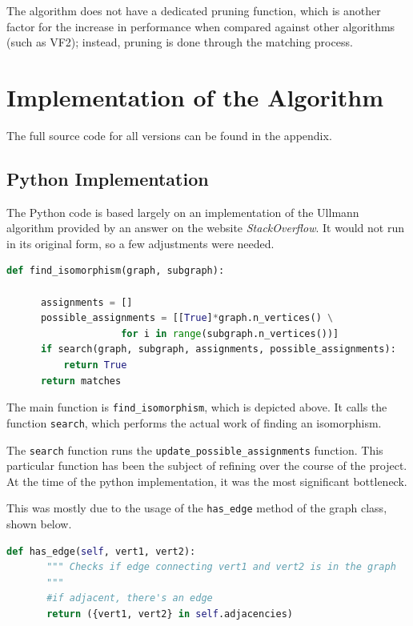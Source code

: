\documentclass{article}
\begin{document}
  The algorithm does not have a dedicated pruning function, which is another factor for the increase in performance when compared against other algorithms (such as VF2); instead, pruning is done through the matching process.\cite{bonnici}

\section{Implementation of the Algorithm}

The full source code for all versions can be found in the appendix.

  \subsection{Python Implementation}
  The Python code is based largely on an implementation of the Ullmann algorithm provided by an answer on the website \textit{StackOverflow}.\cite{pyiso} It would not run in its original form, so a few adjustments were needed.

  \begin{lstlisting}[language=Python,caption={Function used to determine whether an isomorphism exists.}]
  def find_isomorphism(graph, subgraph):

      assignments = []
      possible_assignments = [[True]*graph.n_vertices() \
                    for i in range(subgraph.n_vertices())]
      if search(graph, subgraph, assignments, possible_assignments):
          return True
      return matches
  \end{lstlisting}

  The main function is \texttt{find\_isomorphism}, which is depicted above. It calls the function \texttt{search}, which performs the actual work of finding an isomorphism.

  The \texttt{search} function runs  the \texttt{update\_possible\_assignments} function. This particular function has been the subject of refining over the course of the project. At the time of the python implementation, it was the most significant bottleneck.

  This was mostly due to the usage of the \texttt{has\_edge} method of the graph class, shown below.

  \begin{lstlisting}[language=Python,caption={Code for the \texttt{has\_edge} method of our graph class.}]
  def has_edge(self, vert1, vert2):
       """ Checks if edge connecting vert1 and vert2 is in the graph
       """
       #if adjacent, there's an edge
       return ({vert1, vert2} in self.adjacencies)

  \end{lstlisting}
\end{document}

